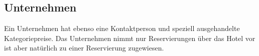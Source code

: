 \documentclass[../../Pflichtenheft.tex]{subfiles}
\begin{document}
    \subsection{Unternehmen}
    Ein Unternehmen hat ebenso eine Kontaktperson und speziell ausgehandelte Kategoriepreise.
    Das Unternehmen nimmt nur Reservierungen über das Hotel vor ist aber natürlich zu einer
    Reservierung zugewiesen.
\end{document}

